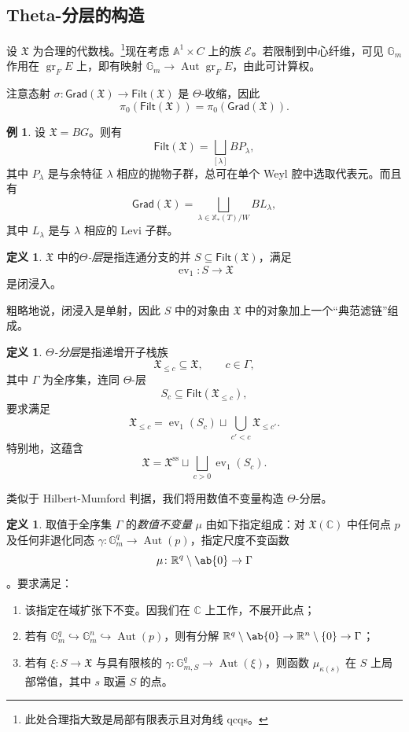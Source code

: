 \documentclass{amsart}
\theoremstyle{definition}
\newtheorem{defn}[thm]{定义}
\newtheorem{exm}[thm]{例}
\theoremstyle{remark}
\theoremstyle{plain}
\theoremstyle{definition}
\theoremstyle{remark}
\newcommand{\A}{\mathbb{A}}
\newcommand{\G}{\mathbb{G}}
\newcommand{\R}{\mathbb{R}}
\newcommand{\C}{\mathbb{C}}
\newcommand{\mc}[1]{\mathcal{#1}}
\newcommand{\mf}[1]{\mathfrak{#1}}
\newcommand{\mr}[1]{\mathrm{#1}}
\newcommand{\on}[1]{\operatorname{#1}}
\newcommand{\ms}[1]{\mathsf{#1}}
\newcommand{\1}{\mathbf{1}}
\newcommand{\2}{\mathbf{2}}
\newcommand{\3}{\mathbf{3}}
\DeclareMathOperator{\Aut}{Aut}
\DeclareMathOperator{\ev}{ev}
\begin{document}
\subsection{Theta-分层的构造}%
\label{sub:Construction of Theta-stratifications}

设 \(\mf{X}\) 为合理的代数栈。\footnote{此处合理指大致是局部有限表示且对角线 qcqs。}现在考虑 \(\A^1 \times C\) 上的族 \(\mc{E}\)。若限制到中心纤维，可见 \(\G_m\) 作用在 \(\on{gr}_F E\) 上，即有映射 \(\G_m \to \Aut \on{gr}_F E\)，由此可计算权。

注意态射 \(\sigma \colon \ms{Grad}(\mf{X}) \to \ms{Filt}(\mf{X})\) 是 \(\Theta\)-收缩，因此
\[ \pi_0(\ms{Filt}(\mf{X})) = \pi_0(\ms{Grad}(\mf{X})). \]

\begin{exm}
    设 \(\mf{X} = BG\)。则有
    \[\ms{Filt}(\mf{X}) = \bigsqcup_{[\lambda]} B P_{\lambda}, \]
    其中 \(P_{\lambda}\) 是与余特征 \(\lambda\) 相应的抛物子群，总可在单个 Weyl 腔中选取代表元。而且有
    \[ \ms{Grad}(\mf{X}) = \bigsqcup_{\lambda \in \mathbb{X}_*(T)/W} B L_{\lambda}, \]
    其中 \(L_{\lambda}\) 是与 \(\lambda\) 相应的 Levi 子群。
\end{exm}

\begin{defn}
    \(\mf{X}\) 中的\textit{\(\Theta\)-层}是指连通分支的并 \(S \subseteq \ms{Filt}(\mf{X})\)，满足
    \[ \ev_1 \colon S \to \mf{X} \]
    是闭浸入。
\end{defn}

粗略地说，闭浸入是单射，因此 \(S\) 中的对象由 \(\mf{X}\) 中的对象加上一个“典范滤链”组成。

\begin{defn}
    \textit{\(\Theta\)-分层}是指递增开子栈族
    \[ \mf{X}_{\leq c} \subseteq \mf{X}, \qquad c \in \Gamma, \]
    其中 \(\Gamma\) 为全序集，连同 \(\Theta\)-层
    \[ S_c \subseteq \ms{Filt}(\mf{X}_{\leq c}), \]
    要求满足
    \[ \mf{X}_{\leq c} = \ev_1(S_c) \sqcup \bigcup_{c' < c} \mf{X}_{\leq c'}. \]
    特别地，这蕴含
    \[ \mf{X} = \mf{X}^{\mr{ss}} \sqcup \bigsqcup_{c > 0} \ev_1(S_c). \]
\end{defn}

类似于 Hilbert-Mumford 判据，我们将用数值不变量构造 \(\Theta\)-分层。
\begin{defn}
    取值于全序集 \(\Gamma\) 的\textit{数值不变量} \(\mu\) 由如下指定组成：对 \(\mf{X}(\C)\) 中任何点 \(p\) 及任何非退化同态 \(\gamma \colon \G_m^q \to \Aut(p)\)，指定尺度不变函数
    \[ \mu \colon \R^q \setminus \ab\{0\} \to \Gamma \]
    。要求满足：
    \begin{enumerate}
        \item 该指定在域扩张下不变。因我们在 \(\C\) 上工作，不展开此点；
        \item 若有 \(\G_m^q \hookrightarrow \G_m^n \hookrightarrow \Aut(p)\)，则有分解 \(\R^q \setminus \ab\{0\} \to \R^n \setminus \{0\} \to \Gamma\)；
        \item 若有 \(\xi \colon S \to \mf{X}\) 与具有限核的 \(\gamma \colon \G_{m, S}^q \to \Aut(\xi)\)，则函数 \(\mu_{\kappa(s)}\) 在 \(S\) 上局部常值，其中 \(s\) 取遍 \(S\) 的点。
    \end{enumerate}
\end{defn}
\end{document}
